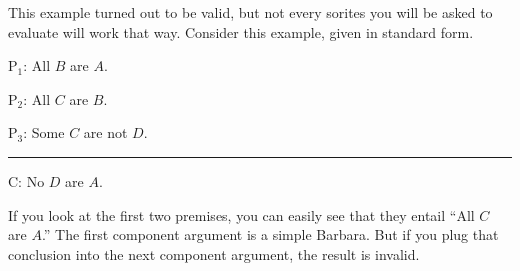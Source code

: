 This example turned out to be valid, but not every sorites you will be asked to evaluate will work that way. Consider this example, given in standard form. 


\begin{earg} 
\item[P$_1$:] All $B$ are $A$.
\item[P$_2$:] All $C$ are $B$.  %
\item[P$_3$:] Some $C$ are not $D$.
\vspace{-.5em} 
 \item [] \rule{0.2\linewidth}{.5pt} 
\item[C:] No $D$ are $A$.
 \end{earg} 

If you look at the first two premises, you can easily see that they entail ``All $C$ are $A$.'' The first component argument is a simple Barbara. But if you plug that conclusion into the next component argument, the result is invalid. 

\begin{center}
\end{center}


